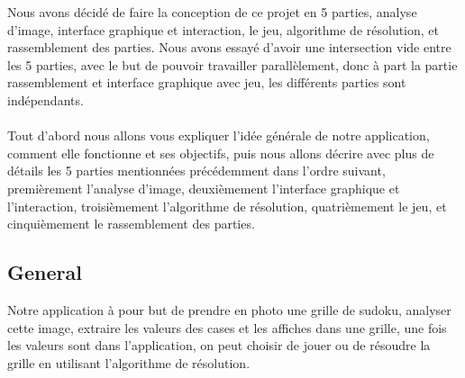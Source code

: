 \documentclass{article}
\begin{document}
Nous avons décidé de faire la conception de ce projet en 5 parties, analyse d'image, interface graphique et interaction, le jeu, algorithme de résolution, et rassemblement des parties. Nous avons essayé d'avoir une intersection vide entre les 5 parties, avec le but de pouvoir travailler parallèlement, donc à part la partie rassemblement et interface graphique avec jeu, les différents parties sont indépendants. 
\\
\\
Tout d'abord nous allons vous expliquer l'idée générale de notre application, comment elle fonctionne et ses objectifs, puis nous allons décrire avec plus de détails les 5 parties mentionnées précédemment dans l'ordre suivant, premièrement l'analyse d'image, deuxièmement l'interface graphique et l'interaction, troisièmement l'algorithme de résolution, quatrièmement le jeu, et cinquièmement le rassemblement des parties.




\subsection{General}

Notre application à pour but de prendre en photo une grille de sudoku, analyser cette image, extraire les valeurs des cases et les affiches dans une grille, une fois les valeurs sont dans l’application, on peut choisir de jouer ou de résoudre la grille en utilisant l’algorithme de résolution. 



\\
\end{document}
